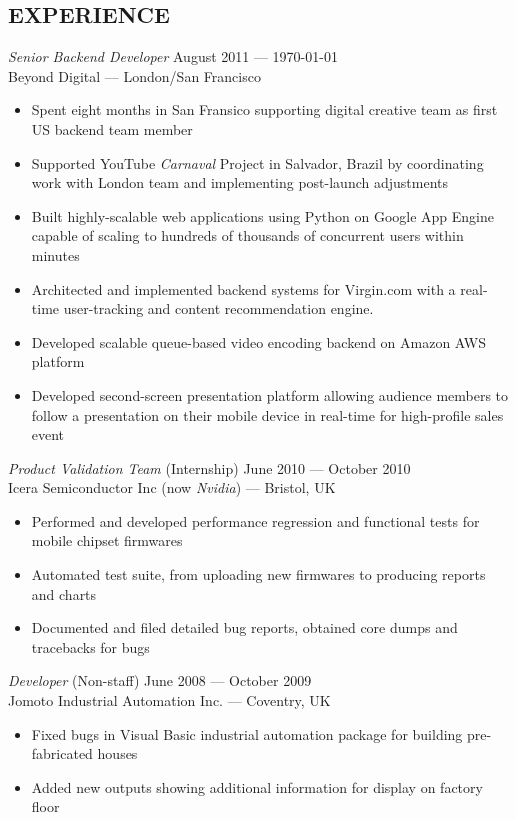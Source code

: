 \documentclass[margin, 10pt]{res} %
\begin{document}
\begin{resume}
\section{EXPERIENCE}

{\sl Senior Backend Developer} \hfill August 2011 --- \currentmonthyear\today \\
Beyond Digital --- London/San Francisco \\

\begin{itemize} \itemsep -2pt %
\item Spent eight months in San Fransico supporting digital creative team as first US backend team member
\item Supported YouTube \textit{Carnaval} Project in Salvador, Brazil by coordinating work with London team and implementing post-launch adjustments
\item Built highly-scalable web applications using Python on Google App Engine capable of scaling
to hundreds of thousands of concurrent users within minutes
\item Architected and implemented backend systems for Virgin.com with a real-time user-tracking and content recommendation engine.
\item Developed scalable queue-based video encoding backend on Amazon AWS platform
\item Developed second-screen presentation platform allowing audience members to follow a presentation on their mobile device in real-time for high-profile sales event
\end{itemize}

{\sl Product Validation Team} \hfill (Internship) June 2010 --- October 2010 \\
Icera Semiconductor Inc (now \textit{Nvidia}) --- Bristol, UK \\
\begin{itemize} 
\item Performed and developed performance regression and functional tests for mobile chipset firmwares
\item Automated test suite, from uploading new firmwares to producing reports and charts
\item Documented and filed detailed bug reports, obtained core dumps and tracebacks for bugs
\end{itemize} 
\clearpage
{\sl Developer} \hfill (Non-staff) June 2008 --- October 2009 \\
Jomoto Industrial Automation Inc. --- Coventry, UK \\
\begin{itemize}
\item Fixed bugs in Visual Basic industrial automation package for building pre-fabricated houses
\item Added new outputs showing additional information for display on factory floor
\end{itemize} 


\end{resume}
\end{document}
